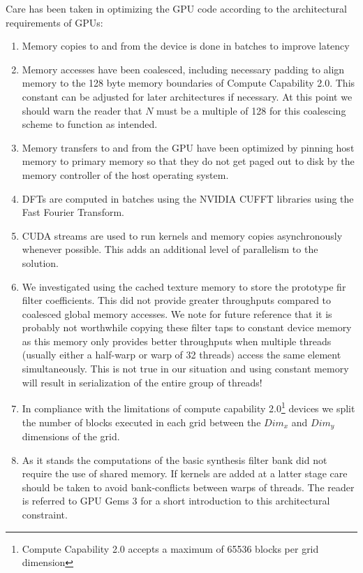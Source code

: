 \documentclass[a4paper,10pt]{article}
\begin{document}
Care has been taken in optimizing the GPU code according to the architectural requirements of GPUs: 
\begin{enumerate}
 \item Memory copies to and from the device is done in batches to improve latency
 \item Memory accesses have been coalesced, including necessary padding to align memory to the 128 byte memory boundaries of Compute Capability 2.0. This constant 
 can be adjusted for later architectures if necessary. At this point we should warn the reader that $N$ must be a multiple of 128 for this coalescing scheme to function
 as intended.
 \item Memory transfers to and from the GPU have been optimized by pinning host memory to primary memory so that they do not get paged out to disk by the memory 
 controller of the host operating system.
 \item DFTs are computed in batches using the NVIDIA CUFFT libraries using the Fast Fourier Transform.
 \item CUDA streams are used to run kernels and memory copies asynchronously whenever possible. This adds an additional level of parallelism to the solution.
 \item We investigated using the cached texture memory to store the prototype \gls{fir} filter coefficients. This did not provide greater throughputs compared to
 coalesced global memory accesses. We note for future reference that it is probably not worthwhile copying these filter taps to constant device memory as this memory only provides
 better throughputs when multiple threads (usually either a half-warp or warp of 32 threads) access the same element simultaneously. This is not true in our situation and
 using constant memory will result in serialization of the entire group of threads!
 \item In compliance with the limitations of compute capability 2.0\footnote{Compute Capability 2.0 accepts a maximum of 65536 blocks per grid dimension} devices we split the 
 number of blocks executed in each grid between the $Dim_x$ and $Dim_y$ dimensions of the grid.
 \item As it stands the computations of the basic synthesis filter bank did not require the use of shared memory. If kernels are added at a latter stage care should be taken
 to avoid bank-conflicts between warps of threads. The reader is referred to GPU Gems 3 \cite[ch. 3]{harris2007parallel} for a short introduction to this architectural constraint.
\end{enumerate}
\end{document}

